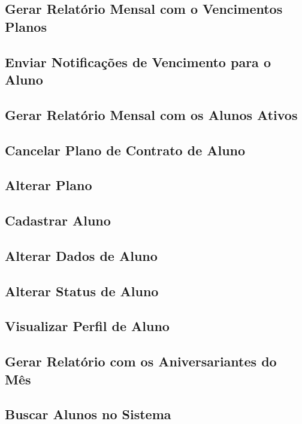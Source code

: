\subsection[Gerar Relatório Mensal com o Vencimentos Planos]{Gerar Relatório Mensal com o Vencimentos Planos}
\subsection[Enviar Notificações de Vencimento para o Aluno]{Enviar Notificações de Vencimento para o Aluno}
\subsection[Gerar Relatório Mensal com os Alunos Ativos]{Gerar Relatório Mensal com os Alunos Ativos}
\subsection[Cancelar Plano de Contrato de Aluno]{Cancelar Plano de Contrato de Aluno}
\subsection[Alterar Plano]{Alterar Plano}
\subsection[Cadastrar Aluno]{Cadastrar Aluno}
\subsection[Alterar Dados de Aluno]{Alterar Dados de Aluno}
\subsection[Alterar Status de Aluno]{Alterar Status de Aluno}
\subsection[Visualizar Perfil de Aluno]{Visualizar Perfil de Aluno}
\subsection[Gerar Relatório com os Aniversariantes do Mês]{Gerar Relatório com os Aniversariantes do Mês}
\subsection[Buscar Alunos no Sistema]{Buscar Alunos no Sistema}
